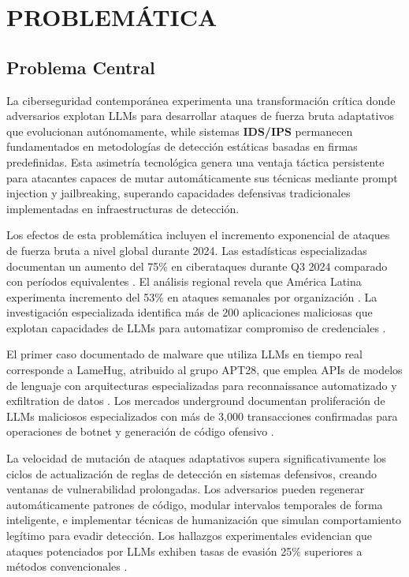 \chapter{PROBLEMÁTICA}

\section{Problema Central}

La ciberseguridad contemporánea experimenta una transformación crítica donde adversarios explotan LLMs para desarrollar ataques de fuerza bruta adaptativos que evolucionan autónomamente, while sistemas \textbf{IDS/IPS} permanecen fundamentados en metodologías de detección estáticas basadas en firmas predefinidas. Esta asimetría tecnológica genera una ventaja táctica persistente para atacantes capaces de mutar automáticamente sus técnicas mediante prompt injection y jailbreaking, superando capacidades defensivas tradicionales implementadas en infraestructuras de detección.

Los efectos de esta problemática incluyen el incremento exponencial de ataques de fuerza bruta a nivel global durante 2024. Las estadísticas especializadas documentan un aumento del 75\% en ciberataques durante Q3 2024 comparado con períodos equivalentes \cite{CheckPoint2024Q3}. El análisis regional revela que América Latina experimenta incremento del 53\% en ataques semanales por organización \cite{CrowdStrike2025LATAM}. La investigación especializada identifica más de 200 aplicaciones maliciosas que explotan capacidades de LLMs para automatizar compromiso de credenciales \cite{Lin2024Malla}.

El primer caso documentado de malware que utiliza LLMs en tiempo real corresponde a LameHug, atribuido al grupo APT28, que emplea APIs de modelos de lenguaje con arquitecturas especializadas para reconnaissance automatizado y exfiltration de datos \cite{Kim2024LameHug}. Los mercados underground documentan proliferación de LLMs maliciosos especializados con más de 3,000 transacciones confirmadas para operaciones de botnet y generación de código ofensivo \cite{Patel2024DarkWebLLM}.

La velocidad de mutación de ataques adaptativos supera significativamente los ciclos de actualización de reglas de detección en sistemas defensivos, creando ventanas de vulnerabilidad prolongadas. Los adversarios pueden regenerar automáticamente patrones de código, modular intervalos temporales de forma inteligente, e implementar técnicas de humanización que simulan comportamiento legítimo para evadir detección. Los hallazgos experimentales evidencian que ataques potenciados por LLMs exhiben tasas de evasión 25\% superiores a métodos convencionales \cite{Rodriguez2024BruteForce}.

